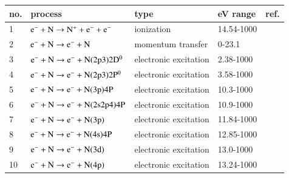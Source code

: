 \begin{table}[!htbp]
  \center{}
  \begin{threeparttable}
    \label{tab:tableN}
    \begin{tabular*}{\textwidth}{l@{\extracolsep{\fill}}llll}
    \toprule
    {no.}  & {process} & {type} &  {eV range}  &  {ref.} \\
    \midrule
      1 & $\rm e^- + N \rightarrow N^+ + e^- + e^-$  &  ionization   &  14.54-1000 &   \cite{lxc:2024:morgan} \\ 
      \midrule     
      2 & $\rm e^- + N \rightarrow e^- + N$  &  momentum transfer   &  0-23.1  & \cite{lxc:2024:morgan}\\   
      \midrule
      3 & $\rm e^- + N \rightarrow e^- + N(2p3)2D^0 $  &  electronic excitation   &  2.38-1000 & \cite{lxc:2024:morgan}\\ 
      4 & $\rm e^- + N \rightarrow e^- + N(2p3)2P^0 $  &  electronic excitation   &  3.58-1000 & \cite{lxc:2024:morgan}\\ 
      5 & $\rm e^- + N \rightarrow e^- + N(3p)4P $  &  electronic excitation   &  10.3-1000 & \cite{lxc:2024:morgan}\\ 
      6 & $\rm e^- + N \rightarrow e^- + N(2s2p4)4P $  &  electronic excitation   &  10.9-1000 & \cite{lxc:2024:morgan}\\ 
      7 & $\rm e^- + N \rightarrow e^- + N(3p) $  &  electronic excitation   &  11.84-1000 & \cite{lxc:2024:morgan}\\ 
      8 & $\rm e^- + N \rightarrow e^- + N(4s)4P $  &  electronic excitation   &  12.85-1000 & \cite{lxc:2024:morgan}\\ 
      9 & $\rm e^- + N \rightarrow e^- + N(3d) $  &  electronic excitation   &  13.0-1000 & \cite{lxc:2024:morgan}\\ 
      10 & $\rm e^- + N \rightarrow e^- + N(4p) $  &  electronic excitation   &  13.24-1000 & \cite{lxc:2024:morgan}\\ 
    \bottomrule
    \end{tabular*}
   \end{threeparttable}
\end{table}

